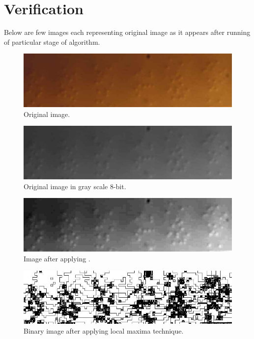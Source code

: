 \documentclass[letterpaper, 14pt]{article}
\begin{document}
\section{Verification}
Below are few images each representing original image as it appears after running of particular stage of algorithm.
\begin{figure}[!htbp]
	\centering
	\includegraphics[totalheight=3cm]{./images/Image1.jpg}
	\caption{Original image.}
	\label{fig:origImage}
\end{figure}
\begin{figure}[!htbp]
	\centering
	\includegraphics[totalheight=3cm]{./images/01_Gray8bit.jpg}
	\caption{Original image in gray scale 8-bit.}
	\label{fig:origImageGray}
\end{figure}
\begin{figure}[!htbp]
	\centering
	\includegraphics[totalheight=3cm]{./images/02_maxFlt.jpg}
	\caption{Image after applying .}
	\label{fig:maxFltImage}
\end{figure}
\begin{figure}[!htbp]
	\centering
	\includegraphics[totalheight=3cm]{./images/03_LocalMax.jpg}
	\caption{Binary image after applying local maxima technique.}
	\label{fig:localMaxImage}
\end{figure}
\end{document}
